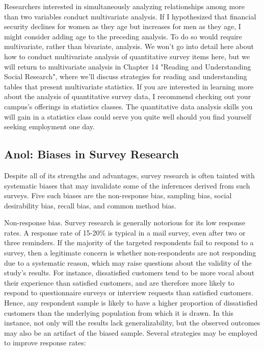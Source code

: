 Researchers interested in simultaneously analyzing relationships among more than two variables conduct multivariate analysis. If I hypothesized that financial security declines for women as they age but increases for men as they age, I might consider adding age to the preceding analysis. To do so would require multivariate, rather than bivariate, analysis. We won’t go into detail here about how to conduct multivariate analysis of quantitative survey items here, but we will return to multivariate analysis in Chapter 14 "Reading and Understanding Social Research", where we’ll discuss strategies for reading and understanding tables that present multivariate statistics. If you are interested in learning more about the analysis of quantitative survey data, I recommend checking out your campus’s offerings in statistics classes. The quantitative data analysis skills you will gain in a statistics class could serve you quite well should you find yourself seeking employment one day.


\subsection{Anol: Biases in Survey Research}

Despite all of its strengths and advantages, survey research is often tainted with systematic biases that may invalidate some of the inferences derived from such surveys. Five such biases are the non-response bias, sampling bias, social desirability bias, recall bias, and common method bias.

Non-response bias. Survey research is generally notorious for its low response rates. A response rate of 15-20\% is typical in a mail survey, even after two or three reminders. If the majority of the targeted respondents fail to respond to a survey, then a legitimate concern is whether non-respondents are not responding due to a systematic reason, which may raise questions about the validity of the study’s results. For instance, dissatisfied customers tend to be more vocal about their experience than satisfied customers, and are therefore more likely to respond to questionnaire surveys or interview requests than satisfied customers. Hence, any respondent sample is likely to have a higher proportion of dissatisfied customers than the underlying population from which it is drawn. In this instance, not only will the results lack generalizability, but the observed outcomes may also be an artifact of the biased sample. Several strategies may be employed to improve response rates:

